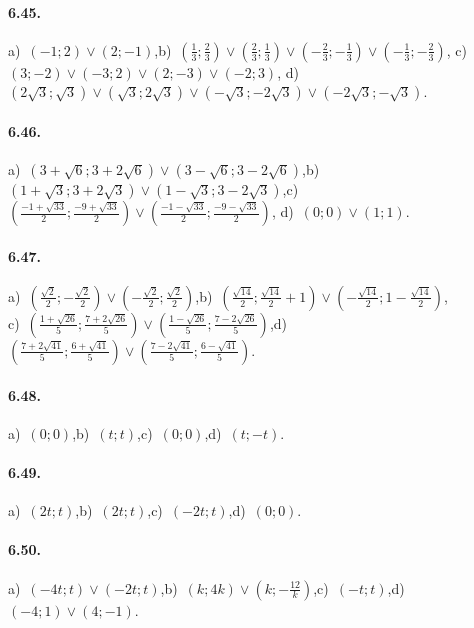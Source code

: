 \paragraph{6.45.} a)~$(-1;2)\vee(2;-1)$,\quad b)~$\left(\frac{1}{3};\frac{2}{3}\right)\vee\left(\frac{2}{3};\frac{1}{3}\right)\vee\left(-\frac{2}{3};-\frac{1}{3}\right)\vee \left(-\frac{1}{3};-\frac{2}{3}\right)$,\quad 
c)~$(3;-2)\vee (-3;2)\vee (2;-3)\vee (-2;3)$,\quad 
d)~$\left(2\sqrt{3};\sqrt{3}\right)\vee\left(\sqrt{3};2\sqrt{3}\right)\vee\left(-\sqrt{3};-2\sqrt{3}\right)\vee \left(-2\sqrt{3};-\sqrt{3}\right)$.

\paragraph{6.46.} a)~$\left(3+\sqrt{6};3+2\sqrt{6}\right)\vee\left(3-\sqrt{6};3-2\sqrt{6}\right)$,\quad b)~$\left(1+\sqrt{3};3+2\sqrt{3}\right)\vee\left(1-\sqrt{3};3-2\sqrt{3}\right)$,\quad c)~$\left(\frac{-1+\sqrt{33}}{2};\frac{-9+\sqrt{33}}{2}\right)\vee\left(\frac{-1-\sqrt{33}}{2};\frac{-9-\sqrt{33}}{2}\right)$,
\quad d)~$(0;0)\vee(1;1)$.

\paragraph{6.47.} a)~$\left(\frac{\sqrt{2}}{2};-\frac{\sqrt{2}}{2}\right)\vee\left(-\frac{\sqrt{2}}{2};\frac{\sqrt{2}}{2}\right)$,\quad b)~$\left(\frac{\sqrt{14}}{2};\frac{\sqrt{14}}{2}+1\right)\vee\left(-\frac{\sqrt{14}}{2};1-\frac{\sqrt{14}}{2}\right)$,\protect\\ c)~$\left(\frac{1+\sqrt{26}}{5};\frac{7+2\sqrt{26}}{5}\right)\vee\left(\frac{1-\sqrt{26}}{5};\frac{7-2\sqrt{26}}{5}\right)$,\quad d)~$\left(\frac{7+2\sqrt{41}}{5};\frac{6+\sqrt{41}}{5}\right)\vee\left(\frac{7-2\sqrt{41}}{5};\frac{6-\sqrt{41}}{5}\right)$.

\paragraph{6.48.} a)~$(0;0)$,\quad b)~$(t;t)$,\quad c)~$(0;0)$,\quad d)~$(t;-t)$.

\paragraph{6.49.} a)~$(2t;t)$,\quad b)~$(2t;t)$,\quad c)~$(-2t;t)$,\quad d)~$(0;0)$.

\paragraph{6.50.} a)~$(-4t;t)\vee(-2t;t)$,\quad b)~$(k;4k)\vee(k;-\frac{1 2}k)$,\quad c)~$(-t;t)$,\quad d)~$(-4;1)\vee(4;-1)$.

